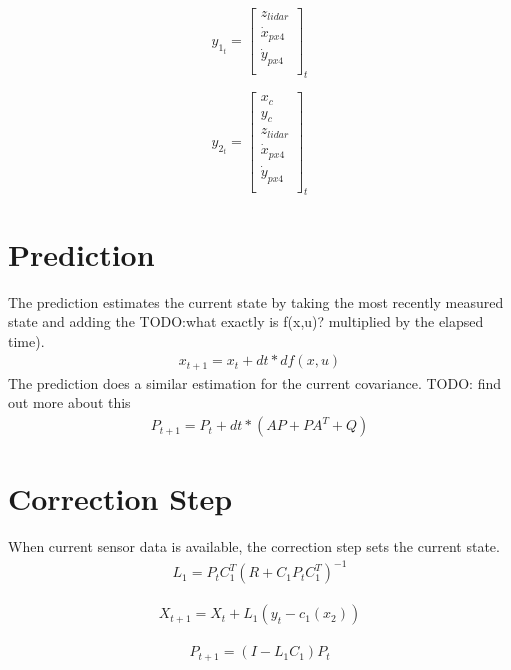 \documentclass{article}
\begin{document}
\[
	y_{1_t}=
	\left[ {\begin{array}{ccc}
				z_{lidar}\\
				\dot x_{px4}\\
				\dot y_{px4}\\
	\end{array} } \right]_t
\]

\[
	y_{2_t}=
	\left[ {\begin{array}{ccccc}
				x_c\\
				y_c\\
				z_{lidar}\\
				\dot x_{px4}\\
				\dot y_{px4}\\
	\end{array} } \right]_t
\]

\section{Prediction}
The prediction estimates the current state by taking the most recently measured state and adding the TODO:what exactly is f(x,u)? multiplied by the elapsed time).
\begin{align}
	x_{t+1} = x_t + dt * df(x,u)
\end{align}
The prediction does a similar estimation for the current covariance. TODO: find out more about this
\begin{align}
	P_{t+1} = P_t + dt * (AP + PA^T + Q)
\end{align}

\section{Correction Step}
When current sensor data is available, the correction step sets the current state.
\begin{align}
	L_1 = P_tC_1^T(R + C_1P_tC_1^T)^{-1}
\end{align}

\begin{align}
	X_{t+1} = X_t + L_1(y_t-c_1(x_2))
\end{align}

\begin{align}
	P_{t+1} = (I-L_1C_1)P_t
\end{align}
\end{document}

